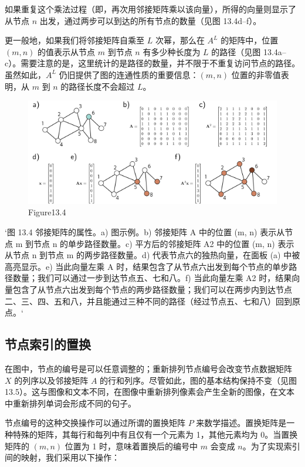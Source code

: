 如果重复这个乘法过程（即，再次用邻接矩阵乘以该向量），所得的向量则显示了从节点 \(n\) 出发，通过两步可以到达的所有节点的数量（见图 13.4d–f）。

更一般地，如果我们将邻接矩阵自乘至 \(L\) 次幂，那么在 \(A^L\) 的矩阵中，位置 \((m, n)\) 的值表示从节点 \(m\) 到节点 \(n\) 有多少种长度为 \(L\) 的路径（见图 13.4a–c）。需要注意的是，这里统计的是路径的数量，并不限于不重复访问节点的路径。虽然如此，\(A^L\) 仍旧提供了图的连通性质的重要信息：\((m, n)\) 位置的非零值表明，从 \(m\) 到 \(n\) 的路径长度不会超过 \(L\)。

\begin{figure}[ht!]
\centering
\includegraphics[width=0.7\linewidth]{png/chapter13/GraphAdjacencyMultiply.png}
\caption{Figure13.4}
\end{figure}

`图 13.4 邻接矩阵的属性。a) 图示例。b) 邻接矩阵 A 中的位置 (m, n) 表示从节点 m 到节点 n 的单步路径数量。c) 平方后的邻接矩阵 A2 中的位置 (m, n) 表示从节点 n 到节点 m 的两步路径数量。d) 代表节点六的独热向量，在面板 (a) 中被高亮显示。e) 当此向量左乘 A 时，结果包含了从节点六出发到每个节点的单步路径数量；我们可以通过一步到达节点五、七和八。f) 当此向量左乘 A2 时，结果向量包含了从节点六出发到每个节点的两步路径数量；我们可以在两步内到达节点二、三、四、五和八，并且能通过三种不同的路径（经过节点五、七和八）回到原点。`

\subsection{节点索引的置换}
在图中，节点的编号是可以任意调整的；重新排列节点编号会改变节点数据矩阵 \(X\) 的列序以及邻接矩阵 \(A\) 的行和列序。尽管如此，图的基本结构保持不变（见图 13.5）。这与图像和文本不同，在图像中重新排列像素会产生全新的图像，在文本中重新排列单词会形成不同的句子。

节点编号的这种交换操作可以通过所谓的置换矩阵 \(P\) 来数学描述。置换矩阵是一种特殊的矩阵，其每行和每列中有且仅有一个元素为 1，其他元素均为 0。当置换矩阵的 \((m, n)\) 位置为 1 时，意味着置换后的编号中 \(m\) 会变成 \(n\)。为了实现索引间的映射，我们采用以下操作：


